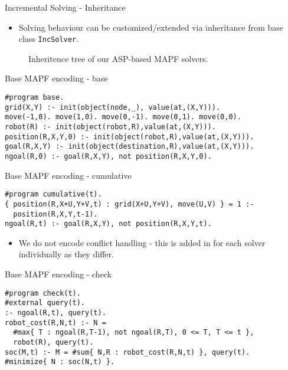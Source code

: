 \documentclass[aspectratio=169,xcolor=svgnames]{beamer}
\theoremstyle{theoremstyle_space}
\begin{document}
\begin{frame}[fragile=singleslide]{Incremental Solving - Inheritance}
\begin{itemize}
    \item Solving behaviour can be customized/extended via inheritance from base class \verb|IncSolver|.
\end{itemize}
\begin{figure}
\centering
{}
\caption{\label{Inheritence Tree}
Inheritence tree of our ASP-based MAPF solvers.
}
\end{figure}
\end{frame}



\begin{frame}[fragile=singleslide]{Base MAPF encoding - base}
\begin{verbatim}
#program base.
grid(X,Y) :- init(object(node,_), value(at,(X,Y))).
move(-1,0). move(1,0). move(0,-1). move(0,1). move(0,0).
robot(R) :- init(object(robot,R),value(at,(X,Y))).
position(R,X,Y,0) :- init(object(robot,R),value(at,(X,Y))).
goal(R,X,Y) :- init(object(destination,R),value(at,(X,Y))).
ngoal(R,0) :- goal(R,X,Y), not position(R,X,Y,0).
\end{verbatim}
\end{frame}

\begin{frame}[fragile=singleslide]{Base MAPF encoding - cumulative}
\begin{verbatim}
#program cumulative(t).
{ position(R,X+U,Y+V,t) : grid(X+U,Y+V), move(U,V) } = 1 :- 
  position(R,X,Y,t-1).
ngoal(R,t) :- goal(R,X,Y), not position(R,X,Y,t).
\end{verbatim}
\begin{itemize}
    \item We do not encode conflict handling - this is added in for each solver individually as they differ.
\end{itemize}
\end{frame}

\begin{frame}[fragile=singleslide]{Base MAPF encoding - check}
\begin{verbatim}
#program check(t).
#external query(t).
:- ngoal(R,t), query(t).
robot_cost(R,N,t) :- N = 
  #max{ T : ngoal(R,T-1), not ngoal(R,T), 0 <= T, T <= t },  
  robot(R), query(t).
soc(M,t) :- M = #sum{ N,R : robot_cost(R,N,t) }, query(t).
#minimize{ N : soc(N,t) }.
\end{verbatim}
\end{frame}
\end{document}

